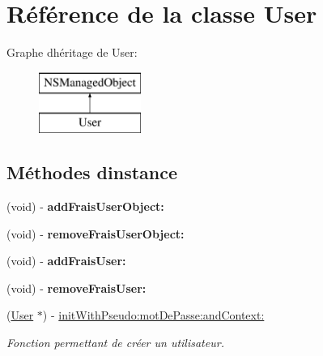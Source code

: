 \hypertarget{interface_user}{}\section{Référence de la classe User}
\label{interface_user}
Graphe d\textquotesingle{}héritage de User\+:\begin{figure}[H]
\begin{center}
\leavevmode
\includegraphics[height=2.000000cm]{interface_user}
\end{center}
\end{figure}
\subsection*{Méthodes d\textquotesingle{}instance}
\begin{DoxyCompactItemize}
\item 
\hypertarget{interface_user_a32af502ae11d0a7dbbff531c1ffc3504}{}(void) -\/ {\bfseries add\+Frais\+User\+Object\+:}\label{interface_user_a32af502ae11d0a7dbbff531c1ffc3504}

\item 
\hypertarget{interface_user_a3585a97b2ec38114120edc0dc590e875}{}(void) -\/ {\bfseries remove\+Frais\+User\+Object\+:}\label{interface_user_a3585a97b2ec38114120edc0dc590e875}

\item 
\hypertarget{interface_user_a8675c260b3b8777a4c0ec0afd604d42a}{}(void) -\/ {\bfseries add\+Frais\+User\+:}\label{interface_user_a8675c260b3b8777a4c0ec0afd604d42a}

\item 
\hypertarget{interface_user_a491aadb2524c74a16b71683fbff5a4d1}{}(void) -\/ {\bfseries remove\+Frais\+User\+:}\label{interface_user_a491aadb2524c74a16b71683fbff5a4d1}

\item 
(\hyperlink{interface_user}{User} $\ast$) -\/ \hyperlink{interface_user_a0728fde4db0d60cf9745f7f5f258bc46}{init\+With\+Pseudo\+:mot\+De\+Passe\+:and\+Context\+:}
\begin{DoxyCompactList}\small\item\em Fonction permettant de créer un utilisateur. \end{DoxyCompactList}\end{DoxyCompactItemize}
